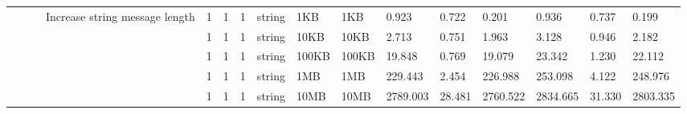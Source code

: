 \begin{landscape}
\begin{table}[]
{\begin{tabular}{@{}ccccllllllllllll@{}}
                                                &                              &                               & \multirow{6}{*}{Increase string message length} & 1                                        & 1                                          & 1                                 & string                           & 1KB                                           & 1KB                                             & 0.923                   & 0.722    & 0.201                        & 0.936                   & 0.737    & 0.199                        \\
                                                &                              &                               &                                                 & 1                                        & 1                                          & 1                                 & string                           & 10KB                                          & 10KB                                            & 2.713                   & 0.751    & 1.963                        & 3.128                   & 0.946    & 2.182                        \\
                                                &                              &                               &                                                 & 1                                        & 1                                          & 1                                 & string                           & 100KB                                         & 100KB                                           & 19.848                  & 0.769    & 19.079                       & 23.342                  & 1.230    & 22.112                       \\
                                                &                              &                               &                                                 & 1                                        & 1                                          & 1                                 & string                           & 1MB                                           & 1MB                                             & 229.443                 & 2.454    & 226.988                      & 253.098                 & 4.122    & 248.976                      \\
                                                &                              &                               &                                                 & 1                                        & 1                                          & 1                                 & string                           & 10MB                                          & 10MB                                            & 2789.003                & 28.481   & 2760.522                     & 2834.665                & 31.330   & 2803.335                     \\

\end{tabular}}
\end{table}
\end{landscape}
